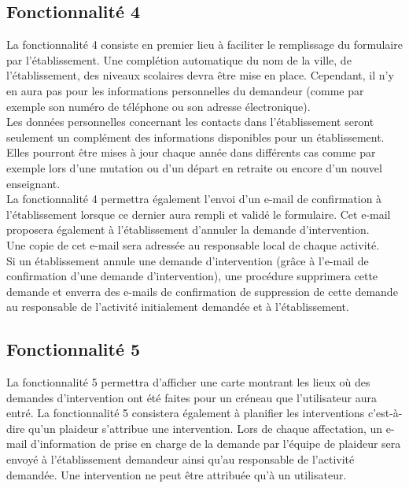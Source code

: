 \subsection{Fonctionnalité 4}
La fonctionnalité 4 consiste en premier lieu à faciliter le remplissage du formulaire par l'établissement. 
Une complétion automatique du nom de la ville, de l'établissement, des niveaux scolaires devra être mise en place. Cependant, il n'y en aura pas pour les informations personnelles du demandeur (comme  par exemple son numéro de téléphone ou son adresse électronique).\\
Les données personnelles concernant les contacts dans l'établissement seront seulement un complément des informations disponibles pour un établissement. Elles pourront être mises à jour chaque année dans différents cas comme par exemple lors d'une mutation ou d'un départ en retraite ou encore d'un nouvel enseignant.   \\

La fonctionnalité 4 permettra également l'envoi d'un e-mail de confirmation à l'établissement lorsque ce dernier aura rempli et validé le formulaire. Cet e-mail proposera également à l'établissement d'annuler la demande d'intervention. \\ Une copie de cet e-mail sera adressée au responsable local de chaque activité.\\

Si un établissement annule une demande d'intervention (grâce à l'e-mail de confirmation d'une demande d'intervention), une procédure supprimera cette demande et enverra des e-mails de confirmation de suppression de cette demande au responsable de l'activité initialement demandée et à l'établissement.  

\subsection{Fonctionnalité 5}
La fonctionnalité 5 permettra d'afficher une carte montrant les lieux où des demandes d'intervention ont été faites pour un créneau que l'utilisateur aura entré.
La fonctionnalité 5 consistera également à planifier les interventions c'est-à-dire qu'un plaideur s'attribue une intervention.
Lors de chaque affectation, un e-mail d'information de prise en charge de la demande par l'équipe de plaideur sera envoyé à l'établissement demandeur ainsi qu'au responsable de l'activité demandée.
Une intervention ne peut être attribuée qu'à un utilisateur.
\\

